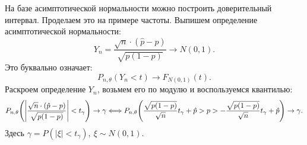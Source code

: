 На базе асимптотической нормальности можно построить доверительный интервал.
Проделаем это на примере частоты. Выпишем определение асимптотической
нормальности:
\[
    Y_n = \frac{\sqrt{n} \cdot (\hat{p} - p)}{\sqrt{p(1 - p)}} \to N(0, 1)
.\]
Это буквально означает:
\[
    P_{n, \theta}(Y_n < t) \to F_{N(0, 1)}(t) 
.\]
Раскроем определение $Y_n$, возьмем его по модулю и воспользуемся квантилью:
\[
    P_{n, \theta}\parens*{\abs*{\frac{\sqrt{n} 
    \cdot (\hat{p} - p)}{\sqrt{p(1 - p)}} } < t_\gamma} \to \gamma \Llra
    P_{n, \theta}\parens*{\frac{\sqrt{p(1 - p)}}{\sqrt{n}}t_\gamma + \hat{p}
    > p > -\frac{\sqrt{p(1 - p)}}{\sqrt{n}}t_\gamma + \hat{p}} \to \gamma
.\]
Здесь $\gamma = P(|\xi| < t_\gamma),~ \xi \sim N(0, 1)$.

